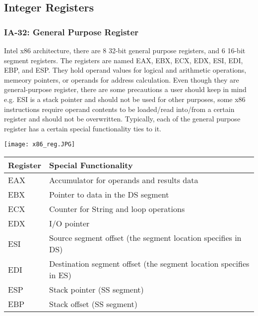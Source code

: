 \documentclass[letterpaper,10pt,titlepage]{article}
\begin{document}
\subsection{Integer Registers}

\subsubsection{IA-32: General Purpose Register}
Intel x86 architecture, there are 8 32-bit general purpose registers, and 
6 16-bit segment registers. The registers are named EAX, EBX, ECX, EDX, ESI, 
EDI, EBP, and ESP. They hold operand values for logical and arithmetic 
operations, memeory pointers, or operands for address calculation. Even though
they are general-purpose register, there are some precautions a user should 
keep in mind e.g. ESI is a stack pointer and should not be used for other 
purposes, some x86 instructions require operand contents to be loaded/read
into/from a certain register and should not be overwritten. Typically, each
of the general purpose register has a certain special functionality ties to it.


\texttt{[image: x86\_reg.JPG]}




\begin{center}
   \begin{longtable}{l p{10cm}}
      \textbf{Register} & \textbf{Special Functionality} \\ \hline
      EAX & Accumulator for operands and results data\\
      EBX & Pointer to data in the DS segment\\
      ECX & Counter for String and loop operations\\
      EDX & I/O pointer\\
      ESI & Source segment offset (the segment location specifies in DS) \\
      EDI & Destination segment offset (the segment location specifies in ES)\\
      ESP & Stack pointer (SS segment)\\
      EBP & Stack offset (SS segment)\\
      \hline
   \end{longtable}
\end{center}
\end{document}
